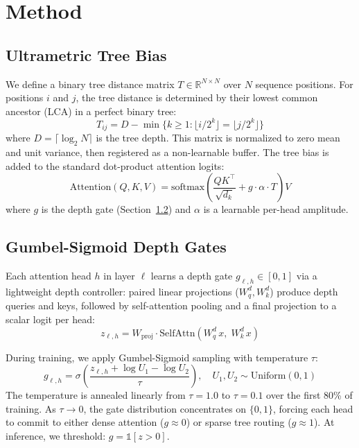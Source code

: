 \documentclass[11pt,a4paper]{article}
\begin{document}
\section{Method}

\subsection{Ultrametric Tree Bias}

We define a binary tree distance matrix $T \in \mathbb{R}^{N \times N}$ over $N$ sequence positions. For positions $i$ and $j$, the tree distance is determined by their lowest common ancestor (LCA) in a perfect binary tree:
\begin{equation}
    T_{ij} = D - \min\{k \geq 1 : \lfloor i / 2^k \rfloor = \lfloor j / 2^k \rfloor\}
\end{equation}
where $D = \lceil \log_2 N \rceil$ is the tree depth. This matrix is normalized to zero mean and unit variance, then registered as a non-learnable buffer. The tree bias is added to the standard dot-product attention logits:
\begin{equation}
    \text{Attention}(Q, K, V) = \text{softmax}\!\left(\frac{QK^\top}{\sqrt{d_k}} + g \cdot \alpha \cdot T\right) V
\end{equation}
where $g$ is the depth gate (Section~\ref{sec:gates}) and $\alpha$ is a learnable per-head amplitude.

\subsection{Gumbel-Sigmoid Depth Gates}
\label{sec:gates}

Each attention head $h$ in layer $\ell$ learns a depth gate $g_{\ell,h} \in [0,1]$ via a lightweight depth controller: paired linear projections ($W_q^d, W_k^d$) produce depth queries and keys, followed by self-attention pooling and a final projection to a scalar logit per head:
\begin{equation}
    z_{\ell,h} = W_{\text{proj}} \cdot \text{SelfAttn}(W_q^d\, x,\; W_k^d\, x)
\end{equation}

During training, we apply Gumbel-Sigmoid sampling with temperature $\tau$:
\begin{equation}
    g_{\ell,h} = \sigma\!\left(\frac{z_{\ell,h} + \log U_1 - \log U_2}{\tau}\right), \quad U_1, U_2 \sim \text{Uniform}(0,1)
\end{equation}
The temperature is annealed linearly from $\tau = 1.0$ to $\tau = 0.1$ over the first 80\% of training. As $\tau \to 0$, the gate distribution concentrates on $\{0,1\}$, forcing each head to commit to either dense attention ($g \approx 0$) or sparse tree routing ($g \approx 1$). At inference, we threshold: $g = \mathbb{1}[z > 0]$.
\end{document}
